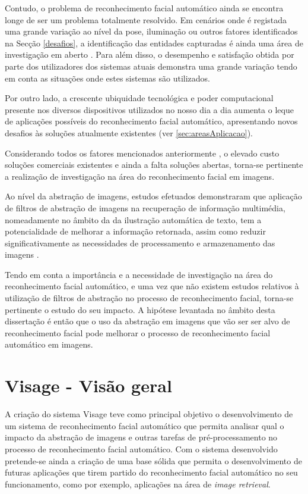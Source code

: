 Contudo, o problema de reconhecimento facial automático ainda se encontra longe de ser um problema totalmente resolvido. Em cenários onde é registada uma grande variação ao nível da pose, iluminação ou outros fatores identificados na Secção \ref{desafios}, a identificação das entidades capturadas é ainda uma área de investigação em aberto \cite{Li2011}. Para além disso, o desempenho e satisfação obtida por parte dos utilizadores dos sistemas atuais demonstra uma grande variação tendo em conta as situações onde estes sistemas são utilizados. 

Por outro lado, a crescente ubiquidade tecnológica e poder computacional presente nos diversos dispositivos utilizados no nosso dia a dia aumenta o leque de aplicações possíveis do reconhecimento facial automático, apresentando novos desafios às soluções atualmente existentes (ver \ref{sec:areasAplicacao}).

Considerando todos os fatores mencionados anteriormente , o elevado custo soluções comerciais existentes e ainda a falta soluções abertas, torna-se pertinente a realização de investigação na área do reconhecimento facial em imagens. 

Ao nível da abstração de imagens, estudos efetuados demonstraram que aplicação de filtros de abstração de imagens na recuperação de informação multimédia, nomeadamente no âmbito da da ilustração automática de texto, tem a potencialidade de melhorar a informação retornada, assim como reduzir significativamente as necessidades de processamento e armazenamento das imagens \cite{Coelho:2012:IAC:2260641.2260676}. 

Tendo em conta a importância e a necessidade de investigação na área do reconhecimento facial automático, e uma vez que não existem estudos relativos à utilização de filtros de abstração no processo de reconhecimento facial, torna-se pertinente o estudo do seu impacto. A hipótese levantada no âmbito desta dissertação é então que o uso da abstração em imagens que vão ser ser alvo de reconhecimento facial pode melhorar o processo de reconhecimento facial automático em imagens.

\section{Visage - Visão geral} \label{sec:visage}
A criação do sistema Visage teve como principal objetivo o desenvolvimento de um sistema de reconhecimento facial automático que permita analisar qual o impacto da abstração de imagens e outras tarefas de pré-processamento no processo de reconhecimento facial automático. Com o sistema desenvolvido pretende-se ainda a criação de uma base sólida que permita o desenvolvimento de futuras aplicações que tirem partido do reconhecimento facial automático no seu funcionamento, como por exemplo, aplicações na área de \textit{image retrieval}.

